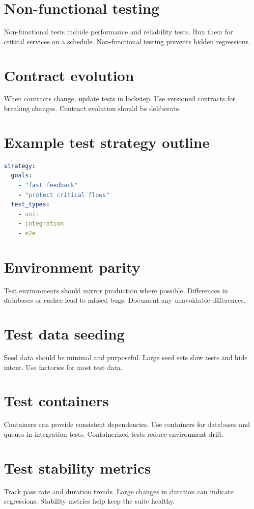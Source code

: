 \section{Non-functional testing}
Non-functional tests include performance and reliability tests.
Run them for critical services on a schedule.
Non-functional testing prevents hidden regressions.

\section{Contract evolution}
When contracts change, update tests in lockstep.
Use versioned contracts for breaking changes.
Contract evolution should be deliberate.

\section{Example test strategy outline}
\begin{lstlisting}[language=YAML]
strategy:
  goals:
    - "fast feedback"
    - "protect critical flows"
  test_types:
    - unit
    - integration
    - e2e
\end{lstlisting}

\section{Environment parity}
Test environments should mirror production where possible.
Differences in databases or caches lead to missed bugs.
Document any unavoidable differences.

\section{Test data seeding}
Seed data should be minimal and purposeful.
Large seed sets slow tests and hide intent.
Use factories for most test data.

\section{Test containers}
Containers can provide consistent dependencies.
Use containers for databases and queues in integration tests.
Containerized tests reduce environment drift.

\section{Test stability metrics}
Track pass rate and duration trends.
Large changes in duration can indicate regressions.
Stability metrics help keep the suite healthy.

